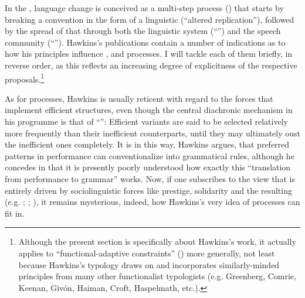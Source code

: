 \documentclass[output=paper]{langsci/langscibook}
\begin{document}
In the , language change is conceived as a multi-step process (\citealt{Croft2000_Change,Croft2006_Change,Aitchison2013_Change}) that starts by breaking a convention in the form of a linguistic  (“altered replication”), followed by the spread of that  through both the linguistic system (“”) and the speech community (“”). Hawkins’s publications contain a number of indications as to how his  principles influence ,  and  processes. I will tackle each of them briefly, in reverse order, as this reflects an increasing degree of explicitness of the respective proposals.\footnote{Although the present section is specifically about Hawkins’s work, it actually applies to “functional-adaptive constraints” () more generally, not least because Hawkins’s  typology draws on and incorporates similarly-minded principles from many other functionalist typologists (e.g. Greenberg, Comrie, Keenan, Givón, Haiman, Croft, Haspelmath, etc.).}

As for  processes, Hawkins is usually reticent with regard to the forces that implement efficient structures, even though the central diachronic mechanism in his programme is that of “”: Efficient variants are said to be selected relatively more frequently than their inefficient counterparts, until they may ultimately oust the inefficient ones completely. It is in this way, Hawkins argues, that preferred patterns in performance can conventionalize into grammatical rules, although he concedes in \citet[10]{Hawkins2014_VarEff} that it is presently poorly understood how exactly this “translation from performance to grammar” works. Now, if one subscribes to the view that  is entirely driven by sociolinguistic forces like prestige, solidarity and the resulting  (e.g. \citealt{Croft2000_Change}; \citealt{Cristofaro2017_Dep}; ), it remains mysterious, indeed, how Hawkins’s very idea of  processes can fit in. 
\end{document}
